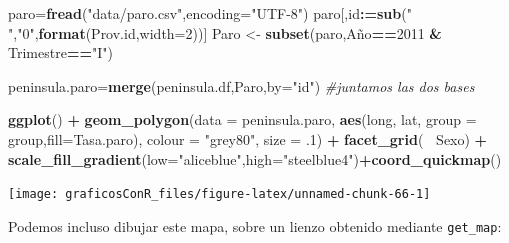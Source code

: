 \documentclass[]{article}
\newenvironment{Shaded}{\begin{snugshade}}{\end{snugshade}}
\newcommand{\CommentTok}[1]{\textcolor[rgb]{0.56,0.35,0.01}{\textit{#1}}}
\newcommand{\DataTypeTok}[1]{\textcolor[rgb]{0.13,0.29,0.53}{#1}}
\newcommand{\DecValTok}[1]{\textcolor[rgb]{0.00,0.00,0.81}{#1}}
\newcommand{\ErrorTok}[1]{\textcolor[rgb]{0.64,0.00,0.00}{\textbf{#1}}}
\newcommand{\FloatTok}[1]{\textcolor[rgb]{0.00,0.00,0.81}{#1}}
\newcommand{\KeywordTok}[1]{\textcolor[rgb]{0.13,0.29,0.53}{\textbf{#1}}}
\newcommand{\NormalTok}[1]{#1}
\newcommand{\OperatorTok}[1]{\textcolor[rgb]{0.81,0.36,0.00}{\textbf{#1}}}
\newcommand{\StringTok}[1]{\textcolor[rgb]{0.31,0.60,0.02}{#1}}
\numberwithin{ejcnt}{section}
\begin{document}
\begin{Shaded}
\begin{Highlighting}[]
\NormalTok{paro=}\KeywordTok{fread}\NormalTok{(}\StringTok{"data/paro.csv"}\NormalTok{,}\DataTypeTok{encoding=}\StringTok{"UTF-8"}\NormalTok{)}
\NormalTok{paro[,id}\OperatorTok{:}\ErrorTok{=}\KeywordTok{sub}\NormalTok{(}\StringTok{" "}\NormalTok{,}\StringTok{"0"}\NormalTok{,}\KeywordTok{format}\NormalTok{(Prov.id,}\DataTypeTok{width=}\DecValTok{2}\NormalTok{))]}
\NormalTok{Paro <-}\StringTok{ }\KeywordTok{subset}\NormalTok{(paro,Año}\OperatorTok{==}\DecValTok{2011} \OperatorTok{&}\StringTok{ }\NormalTok{Trimestre}\OperatorTok{==}\StringTok{"I"}\NormalTok{)}

\NormalTok{peninsula.paro=}\KeywordTok{merge}\NormalTok{(peninsula.df,Paro,}\DataTypeTok{by=}\StringTok{"id"}\NormalTok{) }\CommentTok{#juntamos las dos bases}

\KeywordTok{ggplot}\NormalTok{() }\OperatorTok{+}\StringTok{ }
\StringTok{  }\KeywordTok{geom_polygon}\NormalTok{(}\DataTypeTok{data =}\NormalTok{ peninsula.paro, }\KeywordTok{aes}\NormalTok{(long, lat, }\DataTypeTok{group =}\NormalTok{ group,}\DataTypeTok{fill=}\NormalTok{Tasa.paro), }\DataTypeTok{colour =} \StringTok{"grey80"}\NormalTok{, }\DataTypeTok{size =} \FloatTok{.1}\NormalTok{) }\OperatorTok{+}\StringTok{ }
\StringTok{  }\KeywordTok{facet_grid}\NormalTok{(}\OperatorTok{~}\StringTok{ }\NormalTok{Sexo) }\OperatorTok{+}\StringTok{ }\KeywordTok{scale_fill_gradient}\NormalTok{(}\DataTypeTok{low=}\StringTok{"aliceblue"}\NormalTok{,}\DataTypeTok{high=}\StringTok{"steelblue4"}\NormalTok{)}\OperatorTok{+}\KeywordTok{coord_quickmap}\NormalTok{()}
\end{Highlighting}
\end{Shaded}

\begin{center}\texttt{[image: graficosConR\_files/figure-latex/unnamed-chunk-66-1]} \end{center}

Podemos incluso dibujar este mapa, sobre un lienzo obtenido mediante \texttt{get\_map}:
\end{document}
